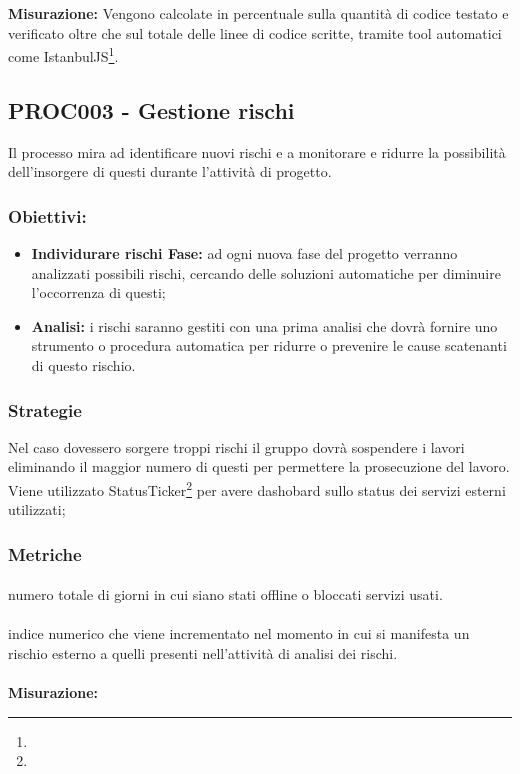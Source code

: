 \documentclass[PianoDiQualifica.tex]{subfiles}
\begin{document}
\textbf{Misurazione:}
Vengono calcolate in percentuale sulla quantità di codice testato e verificato oltre che sul totale delle linee di codice scritte, tramite tool automatici come IstanbulJS\footnote{}.


\subsection{PROC003 - Gestione rischi}
Il processo mira ad identificare nuovi rischi e a monitorare e ridurre la possibilità dell'insorgere di questi durante l'attività di progetto.
\subsubsection{Obiettivi:}
\begin{itemize}
	\item \textbf{Individurare rischi Fase:} ad ogni nuova fase del progetto verranno analizzati possibili rischi, cercando delle soluzioni automatiche per diminuire l'occorrenza di questi;
	\item \textbf{Analisi:} i rischi saranno gestiti con una prima analisi che dovrà fornire uno strumento o procedura automatica per ridurre o prevenire le cause scatenanti di questo rischio.
\end{itemize}
\subsubsection{Strategie}
Nel caso dovessero sorgere troppi rischi il gruppo dovrà sospendere i lavori eliminando il maggior numero di questi per permettere la prosecuzione del lavoro.
Viene utilizzato StatusTicker\footnote{} per avere dashobard sullo status dei servizi esterni utilizzati;

\subsubsection{Metriche}
\paragraph{}
 numero totale di giorni in cui siano stati offline o bloccati servizi usati.

\paragraph{}
 indice numerico che viene incrementato nel momento in cui si manifesta un
rischio esterno a quelli presenti nell’attività di analisi dei rischi.\\ \\
\textbf{Misurazione:}
\end{document}
